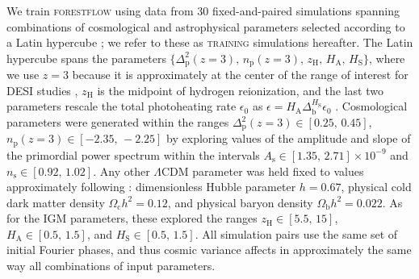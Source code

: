 \documentclass[longauth]{aa}
\newcommand{\forestflow}{\textsc{forestflow}\xspace}
\newcommand{\lacehc}{\textsc{training}\xspace}
\begin{document}
We train \forestflow using data from 30 fixed-and-paired simulations spanning combinations of cosmological and astrophysical parameters selected according to a Latin hypercube \citep{mckay1979ComparisonThreeMethods}; we refer to these as \lacehc simulations hereafter. The Latin hypercube spans the parameters $\{\Delta^2_\mathrm{p}(z=3),\, n_\mathrm{p}(z=3),\, z_\mathrm{H},\, H_\mathrm{A},\, H_\mathrm{S}\}$, where we use $z=3$ because it is approximately at the center of the range of interest for DESI studies \citep{ravoux2023DarkEnergySpectroscopica, karacayli2024Optimal1DLy}, $z_\mathrm{H}$ is the midpoint of hydrogen reionization, and the last two parameters rescale the total photoheating rate $\epsilon_0$ as $\epsilon = H_\mathrm{A} \Delta_\mathrm{b}^{H_\mathrm{S}} \epsilon_0$ \citep{onorbe2017SelfconsistentModelingReionization}. Cosmological parameters were generated within the ranges $\Delta^2_\mathrm{p}(z=3) \in [0.25,\, 0.45]$, $n_\mathrm{p}(z=3) \in [-2.35,\, -2.25]$ by exploring values of the amplitude and slope of the primordial power spectrum within the intervals $A_\mathrm{s} \in [1.35,\, 2.71]\times 10^{-9}$ and $n_\mathrm{s} \in [0.92,\, 1.02]$. Any other $\Lambda$CDM parameter was held fixed to values approximately following \citet{planckcollaboration2020Planck2018Resultsa}: dimensionless Hubble parameter $h=0.67$, physical cold dark matter density $\Omega_\mathrm{c} h^2=0.12$, and physical baryon density $\Omega_\mathrm{b} h^2=0.022$. As for the IGM parameters, these explored the ranges $z_\mathrm{H}\in[5.5,\,15]$, $H_\mathrm{A}\in[0.5,\,1.5]$, and $H_\mathrm{S}\in[0.5,\,1.5]$. All simulation pairs use the same set of initial Fourier phases, and thus cosmic variance affects in approximately the same way all combinations of input parameters.
\end{document}
